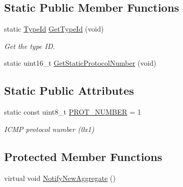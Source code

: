 \subsection*{Static Public Member Functions}
\begin{DoxyCompactItemize}
\item 
static \hyperlink{classns3_1_1TypeId}{Type\+Id} \hyperlink{classns3_1_1Icmpv4L4Protocol_acac9926bbcf1fc494a0ef361af105138}{Get\+Type\+Id} (void)
\begin{DoxyCompactList}\small\item\em Get the type ID. \end{DoxyCompactList}\item 
static uint16\+\_\+t \hyperlink{classns3_1_1Icmpv4L4Protocol_a87663e583585956c7833fd188612c238}{Get\+Static\+Protocol\+Number} (void)
\end{DoxyCompactItemize}
\subsection*{Static Public Attributes}
\begin{DoxyCompactItemize}
\item 
static const uint8\+\_\+t \hyperlink{classns3_1_1Icmpv4L4Protocol_a3419e4f8f36662059a64fcb29c3384ad}{P\+R\+O\+T\+\_\+\+N\+U\+M\+B\+ER} = 1
\begin{DoxyCompactList}\small\item\em I\+C\+MP protocol number (0x1) \end{DoxyCompactList}\end{DoxyCompactItemize}
\subsection*{Protected Member Functions}
\begin{DoxyCompactItemize}
\item 
virtual void \hyperlink{classns3_1_1Icmpv4L4Protocol_a3b967218749e3eb0056641778cc6eccf}{Notify\+New\+Aggregate} ()
\end{DoxyCompactItemize}
